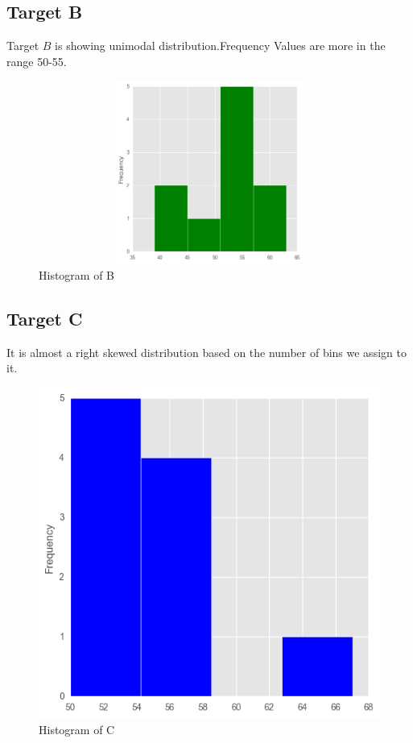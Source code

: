 \documentclass[11pt]{report}
\begin{document}
\subsection{Target B}
Target $B$ is showing unimodal distribution.Frequency Values are more in the range 50-55.
\begin{figure}[h!]
  \centering
  \includegraphics[height = 6cm, width = 14cm]{B_hist.png}
  \caption{Histogram of B}
  \label{fig:hist_b}
\end{figure}

\subsection{Target C}
It is almost a right skewed distribution based on the number of bins we assign to it.
\begin{center}
\begin{figure}[h!]
  \centering
  \includegraphics[height = 7
  cm, width = 14cm]{C_hist.png}
  \caption{Histogram of C}
  \label{fig:hist_c}
\end{figure} 
\end{center}
\end{document}
